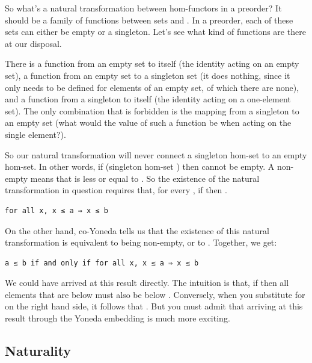 So what's a natural transformation between hom-functors in a preorder?
It should be a family of functions between sets  and
. In a preorder, each of these sets can either be empty
or a singleton. Let's see what kind of functions are there at our
disposal.

There is a function from an empty set to itself (the identity acting on
an empty set), a function  from an empty set to a
singleton set (it does nothing, since it only needs to be defined for
elements of an empty set, of which there are none), and a function from
a singleton to itself (the identity acting on a one-element set). The
only combination that is forbidden is the mapping from a singleton to an
empty set (what would the value of such a function be when acting on the
single element?).

So our natural transformation will never connect a singleton hom-set to
an empty hom-set. In other words, if 
(singleton hom-set ) then  cannot be
empty. A non-empty  means that  is less or
equal to . So the existence of the natural transformation in
question requires that, for every , if
 then .

\begin{verbatim}
for all x, x ≤ a ⇒ x ≤ b
\end{verbatim}

On the other hand, co-Yoneda tells us that the existence of this natural
transformation is equivalent to  being non-empty, or to
. Together, we get:

\begin{verbatim}
a ≤ b if and only if for all x, x ≤ a ⇒ x ≤ b
\end{verbatim}

We could have arrived at this result directly. The intuition is that, if
 then all elements that are below 
must also be below . Conversely, when you substitute
 for  on the right hand side, it follows that
. But you must admit that arriving at this
result through the Yoneda embedding is much more exciting.

\subsection{Naturality}\label{naturality}

